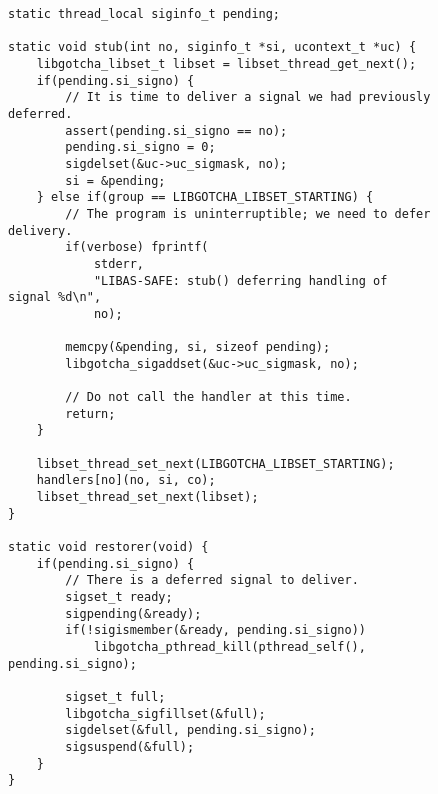 \begin{figure}
\begin{lstlisting}[label=lst:assafe_helpers,caption=\textit{libas-safe}'s signal handler wrapper and control library callback]
static thread_local siginfo_t pending;

static void stub(int no, siginfo_t *si, ucontext_t *uc) {
	libgotcha_libset_t libset = libset_thread_get_next();
	if(pending.si_signo) {
		// It is time to deliver a signal we had previously deferred.
		assert(pending.si_signo == no);
		pending.si_signo = 0;
		sigdelset(&uc->uc_sigmask, no);
		si = &pending;
	} else if(group == LIBGOTCHA_LIBSET_STARTING) {
		// The program is uninterruptible; we need to defer delivery.
		if(verbose) fprintf(
			stderr,
			"LIBAS-SAFE: stub() deferring handling of signal %d\n",
			no);

		memcpy(&pending, si, sizeof pending);
		libgotcha_sigaddset(&uc->uc_sigmask, no);

		// Do not call the handler at this time.
		return;
	}

	libset_thread_set_next(LIBGOTCHA_LIBSET_STARTING);
	handlers[no](no, si, co);
	libset_thread_set_next(libset);
}

static void restorer(void) {
	if(pending.si_signo) {
		// There is a deferred signal to deliver.
		sigset_t ready;
		sigpending(&ready);
		if(!sigismember(&ready, pending.si_signo))
			libgotcha_pthread_kill(pthread_self(), pending.si_signo);

		sigset_t full;
		libgotcha_sigfillset(&full);
		sigdelset(&full, pending.si_signo);
		sigsuspend(&full);
	}
}
\end{lstlisting}
\end{figure}
